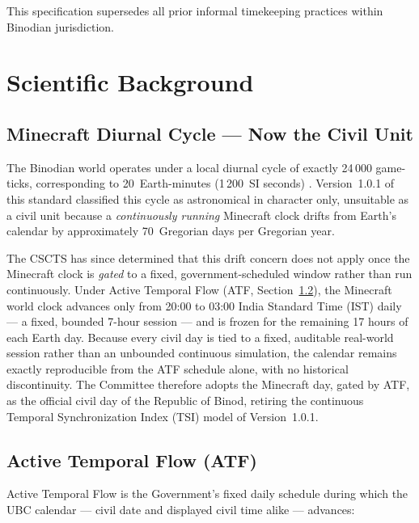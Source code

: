 \documentclass[journal,twoside]{IEEEtran}
\begin{document}
This specification supersedes all prior informal timekeeping practices within Binodian
jurisdiction.

\section{Scientific Background}

\subsection{Minecraft Diurnal Cycle --- Now the Civil Unit}

The Binodian world operates under a local diurnal cycle of exactly 24\,000 game-ticks,
corresponding to 20~Earth-minutes (1\,200~SI seconds) \cite{minecraft_wiki_day}. Version~1.0.1
of this standard classified this cycle as astronomical in character only, unsuitable as a
civil unit because a \emph{continuously running} Minecraft clock drifts from Earth's calendar
by approximately 70~Gregorian days per Gregorian year.

The CSCTS has since determined that this drift concern does not apply once the Minecraft
clock is \emph{gated} to a fixed, government-scheduled window rather than run continuously.
Under Active Temporal Flow (ATF, Section~\ref{sec:atf}), the Minecraft world clock advances
only from 20:00 to 03:00 India Standard Time (IST) daily --- a fixed, bounded 7-hour session
--- and is frozen for the remaining 17 hours of each Earth day. Because every civil day is
tied to a fixed, auditable real-world session rather than an unbounded continuous simulation,
the calendar remains exactly reproducible from the ATF schedule alone, with no historical
discontinuity. The Committee therefore adopts the Minecraft day, gated by ATF, as the
official civil day of the Republic of Binod, retiring the continuous Temporal Synchronization
Index (TSI) model of Version~1.0.1.

\subsection{Active Temporal Flow (ATF)}
\label{sec:atf}

Active Temporal Flow is the Government's fixed daily schedule during which the UBC calendar
--- civil date and displayed civil time alike --- advances:
\end{document}
